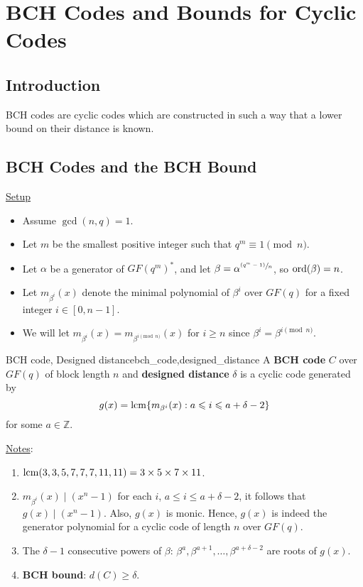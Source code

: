 \chapter{BCH Codes and Bounds for Cyclic Codes}
\section{Introduction}
BCH codes are cyclic codes which are constructed in such a way that
a lower bound on their distance is known.

\section{BCH Codes and the BCH Bound}
\underline{Setup}

\begin{itemize}
    \item Assume $ \gcd(n,q)=1 $.
    \item Let $ m $ be the smallest positive integer such that $ q^m\equiv 1\pmod{n} $.
    \item Let $ \alpha $ be a generator of $ GF(q^m)^* $, and let
          $ \beta=\alpha^{\sfrac{(q^m-1)}{n}} $, so $ \operatorname{ord}(\beta)=n $.
    \item Let $ m_{\beta^i}(x) $ denote the minimal polynomial of
          $ \beta^i $ over $ GF(q) $ for a fixed integer $ i\in[0,n-1] $.
    \item We will let $ m_{\beta^i}(x)=m_{\beta^{i\pmod{n}}}(x) $
          for $ i\geqslant n $ since $ \beta^i=\beta^{i\pmod{n}} $.
\end{itemize}

\begin{Definition}{BCH code, Designed distance}{bch_code,designed_distance}
    A \textbf{BCH code} $ C $ over $ GF(q) $ of block
    length $ n $ and \textbf{designed distance} $ \delta $
    is a cyclic code generated by
    \[ g(x)=\operatorname{lcm} \{m_{\beta^i}(x):a\leqslant i\leqslant a+\delta-2\} \]
    for some $ a\in\mathbb{Z} $.
\end{Definition}

\underline{Notes}:
\begin{enumerate}[label=(\roman*)]
    \item $ \operatorname{lcm}(3,3,5,7,7,7,11,11)=3\times 5\times 7\times 11 $.
    \item $ m_{\beta^i}(x)\mid (x^n-1) $ for each $ i $,
          $ a\leqslant i\leqslant a+\delta-2 $, it follows that $ g(x)\mid (x^n-1) $.
          Also, $ g(x) $ is monic. Hence, $ g(x) $ is indeed the generator polynomial
          for a cyclic code of length $ n $ over $ GF(q) $.
    \item The $ \delta-1 $ consecutive powers of $ \beta $:
          $ \beta^a,\beta^{a+1},\ldots ,\beta^{a+\delta-2} $
          are roots of $ g(x) $.
    \item \textbf{BCH bound}: $ d(C)\geqslant \delta $.
\end{enumerate}


